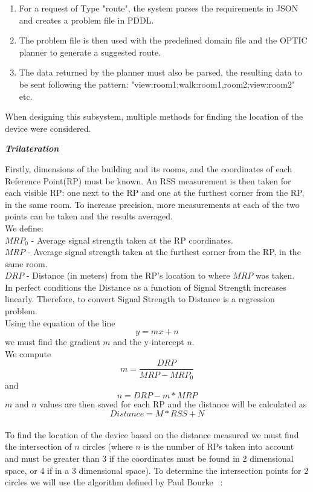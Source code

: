 \begin{enumerate}
\item For a request of Type "route", the system parses the requirements in JSON and creates a problem file in PDDL. 
\item The problem file is then used with the predefined domain file and the OPTIC planner to generate a suggested route.
\item The data returned by the planner must also be parsed, the resulting data to be sent following the pattern:
 "view:room1;walk:room1,room2;view:room2" etc.
\end{enumerate}

\noindent When designing this subsystem, multiple methods for finding the location of the device were considered.

\noindent \textit{\textbf{Trilateration}}

Firstly, dimensions of the building and its rooms, and the coordinates of each Reference Point(RP) must be known. An RSS measurement is then taken for each visible RP: one next to the RP and one at the furthest corner from the RP, in the same room. To increase precision, more measurements at each of the two points can be taken and the results averaged. \\ 
We define: \\
$MRP_0$ - Average signal strength taken at the RP coordinates. \\
$MRP$ - Average signal strength taken at the furthest corner from the RP, in the same room. \\
$DRP$ - Distance (in meters) from the RP's location to where $MRP$ was taken.\\
In perfect conditions the Distance as a function of Signal Strength increases linearly. Therefore, to convert Signal Strength to Distance is a regression problem.\\
Using the equation of the line $$y = mx + n$$ we must find the gradient $m$ and the y-intercept $n$.\\
We compute $$m = \frac{DRP}{MRP - MRP_0}$$
and $$n  = DRP - m * MRP$$
$m$ and $n$ values are then saved for each RP and the distance will be calculated as $$Distance  = M * RSS + N$$
\\
To find the location of the device based on the distance measured we must find the intersection of $n$ circles (where $n$ is the number of RPs taken into account and must be greater than 3 if the coordinates must be found in 2 dimensional space, or 4 if in a 3 dimensional space).  To determine the intersection points for 2 circles we will use the algorithm defined by Paul Bourke ~\cite{Bourke}:\\
